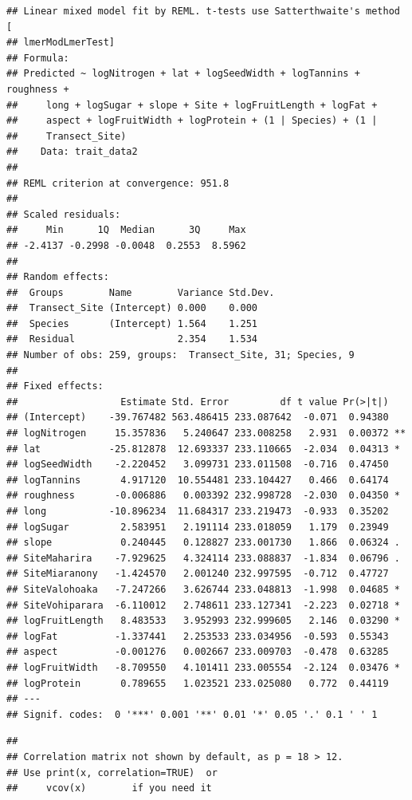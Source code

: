 \documentclass[
  12pt,
]{article}
\begin{document}
\begin{verbatim}
## Linear mixed model fit by REML. t-tests use Satterthwaite's method [
## lmerModLmerTest]
## Formula: 
## Predicted ~ logNitrogen + lat + logSeedWidth + logTannins + roughness +  
##     long + logSugar + slope + Site + logFruitLength + logFat +  
##     aspect + logFruitWidth + logProtein + (1 | Species) + (1 |  
##     Transect_Site)
##    Data: trait_data2
## 
## REML criterion at convergence: 951.8
## 
## Scaled residuals: 
##     Min      1Q  Median      3Q     Max 
## -2.4137 -0.2998 -0.0048  0.2553  8.5962 
## 
## Random effects:
##  Groups        Name        Variance Std.Dev.
##  Transect_Site (Intercept) 0.000    0.000   
##  Species       (Intercept) 1.564    1.251   
##  Residual                  2.354    1.534   
## Number of obs: 259, groups:  Transect_Site, 31; Species, 9
## 
## Fixed effects:
##                  Estimate Std. Error         df t value Pr(>|t|)   
## (Intercept)    -39.767482 563.486415 233.087642  -0.071  0.94380   
## logNitrogen     15.357836   5.240647 233.008258   2.931  0.00372 **
## lat            -25.812878  12.693337 233.110665  -2.034  0.04313 * 
## logSeedWidth    -2.220452   3.099731 233.011508  -0.716  0.47450   
## logTannins       4.917120  10.554481 233.104427   0.466  0.64174   
## roughness       -0.006886   0.003392 232.998728  -2.030  0.04350 * 
## long           -10.896234  11.684317 233.219473  -0.933  0.35202   
## logSugar         2.583951   2.191114 233.018059   1.179  0.23949   
## slope            0.240445   0.128827 233.001730   1.866  0.06324 . 
## SiteMaharira    -7.929625   4.324114 233.088837  -1.834  0.06796 . 
## SiteMiaranony   -1.424570   2.001240 232.997595  -0.712  0.47727   
## SiteValohoaka   -7.247266   3.626744 233.048813  -1.998  0.04685 * 
## SiteVohiparara  -6.110012   2.748611 233.127341  -2.223  0.02718 * 
## logFruitLength   8.483533   3.952993 232.999605   2.146  0.03290 * 
## logFat          -1.337441   2.253533 233.034956  -0.593  0.55343   
## aspect          -0.001276   0.002667 233.009703  -0.478  0.63285   
## logFruitWidth   -8.709550   4.101411 233.005554  -2.124  0.03476 * 
## logProtein       0.789655   1.023521 233.025080   0.772  0.44119   
## ---
## Signif. codes:  0 '***' 0.001 '**' 0.01 '*' 0.05 '.' 0.1 ' ' 1
\end{verbatim}

\begin{verbatim}
## 
## Correlation matrix not shown by default, as p = 18 > 12.
## Use print(x, correlation=TRUE)  or
##     vcov(x)        if you need it
\end{verbatim}
\end{document}
